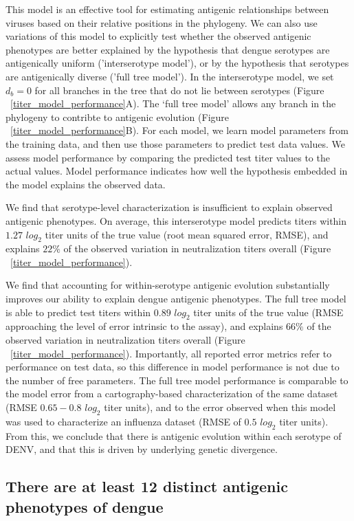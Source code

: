 \documentclass[11pt,oneside,letterpaper]{article}
\begin{document}
This model is an effective tool for estimating antigenic relationships between viruses based on their relative positions in the phylogeny.
We can also use variations of this model to explicitly test whether the observed antigenic phenotypes are better explained by the hypothesis that dengue serotypes are antigenically uniform ('interserotype model'), or by the hypothesis that serotypes are antigenically diverse ('full tree model').
In the interserotype model, we set $d_b = 0$ for all branches in the tree that do not lie between serotypes (Figure ~\ref{titer_model_performance}A).
The `full tree model' allows any branch in the phylogeny to contribte to antigenic evolution (Figure ~\ref{titer_model_performance}B).
For each model, we learn model parameters from the training data, and then use those parameters to predict test data values.
We assess model performance by comparing the predicted test titer values to the actual values.
Model performance indicates how well the hypothesis embedded in the model explains the observed data.

We find that serotype-level characterization is insufficient to explain observed antigenic phenotypes.
On average, this interserotype model predicts titers within $1.27$ $log_2$ titer units of the true value (root mean squared error, RMSE), and explains $22\%$ of the observed variation in neutralization titers overall (Figure ~\ref{titer_model_performance}).

We find that accounting for within-serotype antigenic evolution substantially improves our ability to explain dengue antigenic phenotypes.
The full tree model is able to predict test titers within $0.89$ $log_2$ titer units of the true value (RMSE approaching the level of error intrinsic to the assay), and explains $66\%$ of the observed variation in neutralization titers overall (Figure ~\ref{titer_model_performance}).
Importantly, all reported error metrics refer to performance on test data, so this difference in model performance is not due to the number of free parameters.
The full tree model performance is comparable to the model error from a cartography-based characterization of the same dataset (RMSE $0.65-0.8$ $log_2$ titer units), and to the error observed when this model was used to characterize an influenza dataset (RMSE of $0.5$ $log_2$ titer units).
From this, we conclude that there is antigenic evolution within each serotype of DENV, and that this is driven by underlying genetic divergence.

\subsection{There are at least 12 distinct antigenic phenotypes of dengue}
\end{document}
